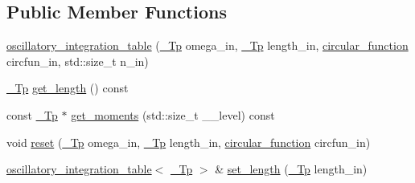 \subsection*{Public Member Functions}
\begin{DoxyCompactItemize}
\item 
\hyperlink{struct____gnu__cxx_1_1oscillatory__integration__table_a0c69a8118986fe8c7de49d824ff26e1f}{oscillatory\+\_\+integration\+\_\+table} (\hyperlink{namespace____gnu__cxx_a3b19a9c800ca194374ef9172290f7d79}{\+\_\+\+Tp} omega\+\_\+in, \hyperlink{namespace____gnu__cxx_a3b19a9c800ca194374ef9172290f7d79}{\+\_\+\+Tp} length\+\_\+in, \hyperlink{struct____gnu__cxx_1_1oscillatory__integration__table_aea06e472bb9ff6c535cfdc6a84b14e96}{circular\+\_\+function} circfun\+\_\+in, std\+::size\+\_\+t n\+\_\+in)
\item 
\hyperlink{namespace____gnu__cxx_a3b19a9c800ca194374ef9172290f7d79}{\+\_\+\+Tp} \hyperlink{struct____gnu__cxx_1_1oscillatory__integration__table_a633fd01504b26abd2725d2d7e38c03c1}{get\+\_\+length} () const
\item 
const \hyperlink{namespace____gnu__cxx_a3b19a9c800ca194374ef9172290f7d79}{\+\_\+\+Tp} $\ast$ \hyperlink{struct____gnu__cxx_1_1oscillatory__integration__table_a7bb771c92944e0933bc90d7160cfb5be}{get\+\_\+moments} (std\+::size\+\_\+t \+\_\+\+\_\+level) const
\item 
void \hyperlink{struct____gnu__cxx_1_1oscillatory__integration__table_a6eac687c4e5dc65c8bf6626b24839975}{reset} (\hyperlink{namespace____gnu__cxx_a3b19a9c800ca194374ef9172290f7d79}{\+\_\+\+Tp} omega\+\_\+in, \hyperlink{namespace____gnu__cxx_a3b19a9c800ca194374ef9172290f7d79}{\+\_\+\+Tp} length\+\_\+in, \hyperlink{struct____gnu__cxx_1_1oscillatory__integration__table_aea06e472bb9ff6c535cfdc6a84b14e96}{circular\+\_\+function} circfun\+\_\+in)
\item 
\hyperlink{struct____gnu__cxx_1_1oscillatory__integration__table}{oscillatory\+\_\+integration\+\_\+table}$<$ \hyperlink{namespace____gnu__cxx_a3b19a9c800ca194374ef9172290f7d79}{\+\_\+\+Tp} $>$ \& \hyperlink{struct____gnu__cxx_1_1oscillatory__integration__table_a086da28f8232d48ed2a3257eba2aec4c}{set\+\_\+length} (\hyperlink{namespace____gnu__cxx_a3b19a9c800ca194374ef9172290f7d79}{\+\_\+\+Tp} length\+\_\+in)
\end{DoxyCompactItemize}
